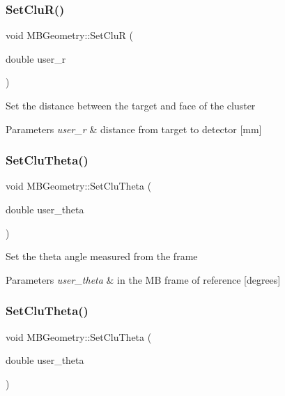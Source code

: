 \subsubsection{\texorpdfstring{Set\+Clu\+R()}{SetCluR()}\hspace{0.1cm}{\footnotesize\ttfamily [2/2]}}
{\footnotesize\ttfamily void M\+B\+Geometry\+::\+Set\+CluR (\begin{DoxyParamCaption}\item[{double}]{user\+\_\+r }\end{DoxyParamCaption})}

Set the distance between the target and face of the cluster 
\begin{DoxyParams}{Parameters}
{\em user\+\_\+r} & distance from target to detector \mbox{[}mm\mbox{]} \\
\hline
\end{DoxyParams}
\mbox{\label{class_m_b_geometry_a9a2a8c9609141be92d7ba30e6087aa30}} 
\subsubsection{\texorpdfstring{Set\+Clu\+Theta()}{SetCluTheta()}\hspace{0.1cm}{\footnotesize\ttfamily [1/2]}}
{\footnotesize\ttfamily void M\+B\+Geometry\+::\+Set\+Clu\+Theta (\begin{DoxyParamCaption}\item[{double}]{user\+\_\+theta }\end{DoxyParamCaption})}

Set the theta angle measured from the frame 
\begin{DoxyParams}{Parameters}
{\em user\+\_\+theta} & in the MB frame of reference \mbox{[}degrees\mbox{]} \\
\hline
\end{DoxyParams}
\mbox{\label{class_m_b_geometry_a9a2a8c9609141be92d7ba30e6087aa30}} 
\subsubsection{\texorpdfstring{Set\+Clu\+Theta()}{SetCluTheta()}\hspace{0.1cm}{\footnotesize\ttfamily [2/2]}}
{\footnotesize\ttfamily void M\+B\+Geometry\+::\+Set\+Clu\+Theta (\begin{DoxyParamCaption}\item[{double}]{user\+\_\+theta }\end{DoxyParamCaption})}

